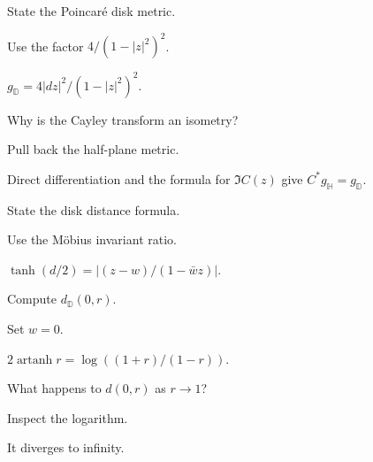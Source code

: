 \begin{exercise}\label{exr:vii32-10}
State the Poincaré disk metric.
\end{exercise}
\begin{hint}
Use the factor \(4/(1-|z|^2)^2\).
\end{hint}
\begin{solution}
\(g_{\mathbb D}=4|dz|^2/(1-|z|^2)^2\).
\end{solution}

\begin{exercise}\label{exr:vii32-11}
Why is the Cayley transform an isometry?
\end{exercise}
\begin{hint}
Pull back the half-plane metric.
\end{hint}
\begin{solution}
Direct differentiation and the formula for \(\Im C(z)\) give \(C^*g_{\mathbb H}=g_{\mathbb D}\).
\end{solution}

\begin{exercise}\label{exr:vii32-12}
State the disk distance formula.
\end{exercise}
\begin{hint}
Use the Möbius invariant ratio.
\end{hint}
\begin{solution}
\(\tanh(d/2)=|(z-w)/(1-\bar wz)|\).
\end{solution}

\begin{exercise}\label{exr:vii32-13}
Compute \(d_{\mathbb D}(0,r)\).
\end{exercise}
\begin{hint}
Set \(w=0\).
\end{hint}
\begin{solution}
\(2\operatorname{artanh}r=\log((1+r)/(1-r))\).
\end{solution}

\begin{exercise}\label{exr:vii32-14}
What happens to \(d(0,r)\) as \(r\to1\)?
\end{exercise}
\begin{hint}
Inspect the logarithm.
\end{hint}
\begin{solution}
It diverges to infinity.
\end{solution}

